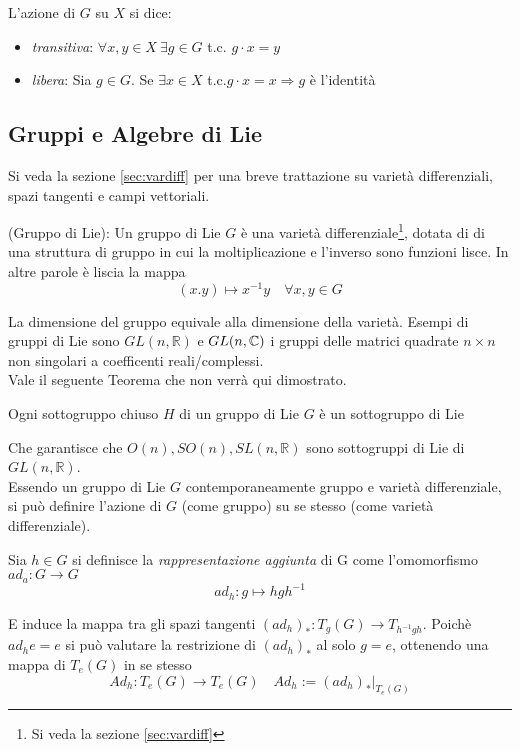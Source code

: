L'azione di $G$ su $X$ si dice:
\begin{itemize}
   \item \emph{transitiva}: \quad $\forall x,y \in X \: \exists g \in G$ t.c. $g\cdot x = y$
   \item \emph{libera}: \quad Sia $g \in G$. Se $\exists x \in X$ t.c.$ g\cdot x = x
      \Rightarrow g$ è l'identità
\end{itemize}
\subsection{Gruppi e Algebre di Lie}
Si veda la sezione \ref{sec:vardiff} per una breve trattazione su varietà differenziali,
spazi tangenti e campi vettoriali.

\begin{definition}{(Gruppo di Lie):}\label{def:liegroup}
   Un gruppo di Lie $G$ è una varietà differenziale\footnote{Si veda la sezione
   \ref{sec:vardiff}}, dotata di di una struttura di gruppo in cui la
   moltiplicazione e l'inverso sono funzioni lisce. In altre parole è liscia la mappa
      $$ (x.y) \mapsto x^{-1}y \quad \forall x,y \in G$$
\end{definition}
La dimensione del gruppo equivale alla dimensione della varietà.
Esempi di gruppi di Lie sono $GL(n,\mathbb{R})$ e $GL(n,\mathbb{C})$ i gruppi
delle matrici quadrate $n \times n$ non singolari a coefficenti reali/complessi.\\
Vale il seguente Teorema che non verrà qui dimostrato.
\begin{theorem}
   Ogni sottogruppo chiuso $H$ di un gruppo di Lie $G$ è un sottogruppo di Lie
\end{theorem}
Che garantisce che $O(n), SO(n), SL(n,\mathbb{R})$ sono sottogruppi di Lie di
$GL(n,\mathbb{R})$.\\

Essendo un gruppo di Lie $G$ contemporaneamente gruppo e varietà differenziale, si
può definire l'azione di $G$ (come gruppo) su se stesso (come varietà differenziale).

\begin{definition}\label{def:adjrep}
   Sia $h \in G$ si definisce la \emph{rappresentazione aggiunta} di G come
   l'omomorfismo $ ad_a : G \to G $
   $$
      ad_h : g \mapsto h g h^{-1}
   $$
\end{definition}
E induce la mappa tra gli spazi tangenti $(ad_h)_* : T_g(G) \to T_{h^{-1}gh}$.
Poichè $ad_h e = e$ si può valutare la restrizione di $(ad_h)_*$ al solo $g=e$,
ottenendo una mappa di $T_e(G)$ in se stesso
$$
   Ad_h : T_e(G) \to T_e(G) \quad Ad_h := (ad_h)_* |_{T_e(G)}
$$

